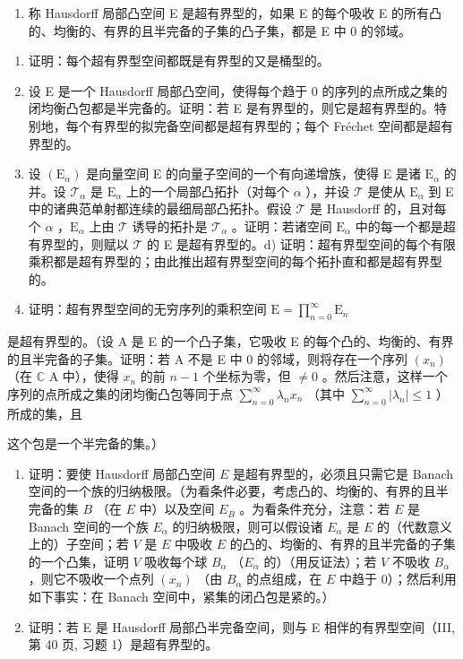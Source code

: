 \begin{enumerate}
\def\labelenumi{\arabic{enumi})}
\setcounter{enumi}{18}
\tightlist
\item
  称 Hausdorff 局部凸空间 E 是超有界型的，如果 E 的每个吸收 E 的所有凸的、均衡的、有界的且半完备的子集的凸子集，都是 E 中 0 的邻域。
\end{enumerate}

\begin{enumerate}
\def\labelenumi{\alph{enumi})}
\item
  证明：每个超有界型空间都既是有界型的又是桶型的。
\item
  设 E 是一个 Hausdorff 局部凸空间，使得每个趋于 0 的序列的点所成之集的闭均衡凸包都是半完备的。证明：若 E 是有界型的，则它是超有界型的。特别地，每个有界型的拟完备空间都是超有界型的；每个 Fréchet 空间都是超有界型的。
\item
  设 \((\mathrm{E}_{\alpha})\) 是向量空间 E 的向量子空间的一个有向递增族，使得 E 是诸 \(\mathrm{E}_{\alpha}\) 的并。设 \(\mathcal{T}_{\alpha}\) 是 \(\mathrm{E}_{\alpha}\) 上的一个局部凸拓扑（对每个 \(\alpha\) ），并设 \(\mathcal{T}\) 是使从 \(\mathrm{E}_{\alpha}\) 到 E 中的诸典范单射都连续的最细局部凸拓扑。假设 \(\mathcal{T}\) 是 Hausdorff 的，且对每个 \(\alpha\) ，\(\mathrm{E}_{\alpha}\) 上由 \(\mathcal{T}\) 诱导的拓扑是 \(\mathcal{T}_{\alpha}\) 。证明：若诸空间 \(\mathrm{E}_{\alpha}\) 中的每一个都是超有界型的，则赋以 \(\mathcal{T}\) 的 E 是超有界型的。d) 证明：超有界型空间的每个有限乘积都是超有界型的；由此推出超有界型空间的每个拓扑直和都是超有界型的。
\item
  证明：超有界型空间的无穷序列的乘积空间 \(\mathrm{E} = \prod_{n=0}^{\infty} \mathrm{E}_n\)
\end{enumerate}

是超有界型的。（设 A 是 E 的一个凸子集，它吸收 E 的每个凸的、均衡的、有界的且半完备的子集。证明：若 A 不是 E 中 0 的邻域，则将存在一个序列 \((x_{n})\) （在 \(\mathbb{C}\) A 中），使得 \(x_{n}\) 的前 \(n - 1\) 个坐标为零，但 \(\neq 0\) 。然后注意，这样一个序列的点所成之集的闭均衡凸包等同于点 \(\sum_{n = 0}^{\infty}\lambda_n x_n\) （其中 \(\sum_{n = 0}^{\infty}|\lambda_n| \leqslant 1\) ）所成的集，且

这个包是一个半完备的集。）

\begin{enumerate}
\def\labelenumi{\arabic{enumi})}
\setcounter{enumi}{19}
\item
  证明：要使 Hausdorff 局部凸空间 \(E\) 是超有界型的，必须且只需它是 Banach 空间的一个族的归纳极限。（为看条件必要，考虑凸的、均衡的、有界的且半完备的集 \(B\) （在 \(E\) 中）以及空间 \(E_B\) 。为看条件充分，注意：若 \(E\) 是 Banach 空间的一个族 \(E_\alpha\) 的归纳极限，则可以假设诸 \(E_\alpha\) 是 \(E\) 的（代数意义上的）子空间；若 \(V\) 是 \(E\) 中吸收 \(E\) 的凸的、均衡的、有界的且半完备的子集的一个凸集，证明 \(V\) 吸收每个球 \(B_\alpha\) （\(E_\alpha\) 的）（用反证法）；若 \(V\) 不吸收 \(B_\alpha\) ，则它不吸收一个点列 \((x_n)\) （由 \(B_\alpha\) 的点组成，在 \(E\) 中趋于 0）；然后利用如下事实：在 Banach 空间中，紧集的闭凸包是紧的。）
\item
  证明：若 E 是 Hausdorff 局部凸半完备空间，则与 E 相伴的有界型空间（III, 第 40 页, 习题 1）是超有界型的。
\end{enumerate}

